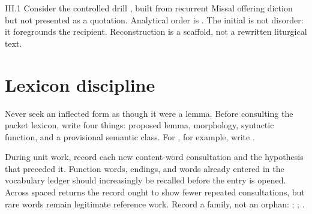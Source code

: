 \begin{courseunit}{III.1}
Consider the controlled drill , built from recurrent Missal offering diction but not presented as a
quotation. Analytical order is
. The initial
 is not disorder: it foregrounds the recipient. Reconstruction is
a scaffold, not a rewritten liturgical text.

\section{Lexicon discipline}

Never seek an inflected form as though it were a lemma. Before consulting the
packet lexicon, write four things: proposed lemma, morphology, syntactic function,
and a provisional semantic class. For , for example, write
.

During unit work, record each new content-word consultation and the hypothesis
that preceded it. Function words, endings, and words already entered in the
vocabulary ledger should increasingly be recalled before the entry is opened.
Across spaced returns the record ought to show fewer repeated consultations,
but rare words remain legitimate reference work. Record a family, not an
orphan: ; ;
.




\end{courseunit}

